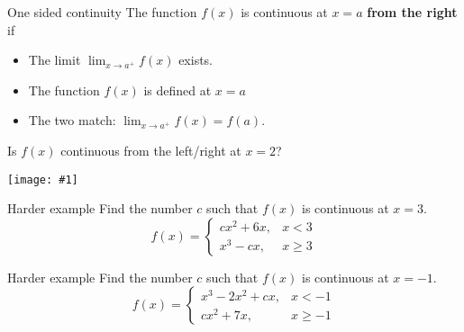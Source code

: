 \documentclass[t]{beamer}
\newcommand{\img}[1]{
\vfill
\texttt{[image: \#1]}
\vfill
}
\begin{document}
\begin{frame}{One sided continuity}
The function $f(x)$ is continuous at $x = a$  \textbf{from the right} if 
\begin{itemize}
\item The limit $\displaystyle \lim_{x \to a^+} f(x)$ exists.
\item The function $f(x)$ is defined at $x = a$
\item The two match: $\displaystyle \lim_{x \to a^+} f(x) = f(a)$.
\end{itemize}
\end{frame}

\begin{frame}{Is $f(x)$ continuous from the left/right at $x = 2$?}
\img{onesided}
\end{frame}

\begin{frame}{Harder example}
Find the number $c$ such that $f(x)$ is continuous at $x = 3$.
$$
f(x) = 
\begin{cases}
cx^2 + 6x, & x < 3 \\
x^3 - cx, & x \ge 3
\end{cases}
$$
\end{frame}

\begin{frame}{Harder example}
Find the number $c$ such that $f(x)$ is continuous at $x = -1$.
$$
f(x) = 
\begin{cases}
x^3 -2x^2 + cx, & x < -1 \\
cx^2 + 7x, & x \ge -1
\end{cases}
$$
\end{frame}
\end{document}
